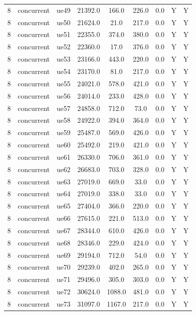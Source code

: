 \begin{table}[ht]
\begin{tabular}{|c|c|c|c|c|c|c|c|c|}
8 & concurrent & ue49 & 21392.0 & 166.0 & 226.0 & 0.0 & Y & Y \\
8 & concurrent & ue50 & 21624.0 & 21.0 & 217.0 & 0.0 & Y & Y \\
8 & concurrent & ue51 & 22355.0 & 374.0 & 380.0 & 0.0 & Y & Y \\
8 & concurrent & ue52 & 22360.0 & 17.0 & 376.0 & 0.0 & Y & Y \\
8 & concurrent & ue53 & 23166.0 & 443.0 & 220.0 & 0.0 & Y & Y \\
8 & concurrent & ue54 & 23170.0 & 81.0 & 217.0 & 0.0 & Y & Y \\
8 & concurrent & ue55 & 24021.0 & 578.0 & 421.0 & 0.0 & Y & Y \\
8 & concurrent & ue56 & 24014.0 & 233.0 & 428.0 & 0.0 & Y & Y \\
8 & concurrent & ue57 & 24858.0 & 712.0 & 73.0 & 0.0 & Y & Y \\
8 & concurrent & ue58 & 24922.0 & 394.0 & 364.0 & 0.0 & Y & Y \\
8 & concurrent & ue59 & 25487.0 & 569.0 & 426.0 & 0.0 & Y & Y \\
8 & concurrent & ue60 & 25492.0 & 219.0 & 421.0 & 0.0 & Y & Y \\
8 & concurrent & ue61 & 26330.0 & 706.0 & 361.0 & 0.0 & Y & Y \\
8 & concurrent & ue62 & 26683.0 & 703.0 & 328.0 & 0.0 & Y & Y \\
8 & concurrent & ue63 & 27019.0 & 669.0 & 33.0 & 0.0 & Y & Y \\
8 & concurrent & ue64 & 27019.0 & 338.0 & 33.0 & 0.0 & Y & Y \\
8 & concurrent & ue65 & 27404.0 & 366.0 & 220.0 & 0.0 & Y & Y \\
8 & concurrent & ue66 & 27615.0 & 221.0 & 513.0 & 0.0 & Y & Y \\
8 & concurrent & ue67 & 28344.0 & 610.0 & 426.0 & 0.0 & Y & Y \\
8 & concurrent & ue68 & 28346.0 & 229.0 & 424.0 & 0.0 & Y & Y \\
8 & concurrent & ue69 & 29194.0 & 712.0 & 54.0 & 0.0 & Y & Y \\
8 & concurrent & ue70 & 29239.0 & 402.0 & 265.0 & 0.0 & Y & Y \\
8 & concurrent & ue71 & 29496.0 & 305.0 & 303.0 & 0.0 & Y & Y \\
8 & concurrent & ue72 & 30624.0 & 1088.0 & 481.0 & 0.0 & Y & Y \\
8 & concurrent & ue73 & 31097.0 & 1167.0 & 217.0 & 0.0 & Y & Y \\

\end{tabular}
\end{table}
